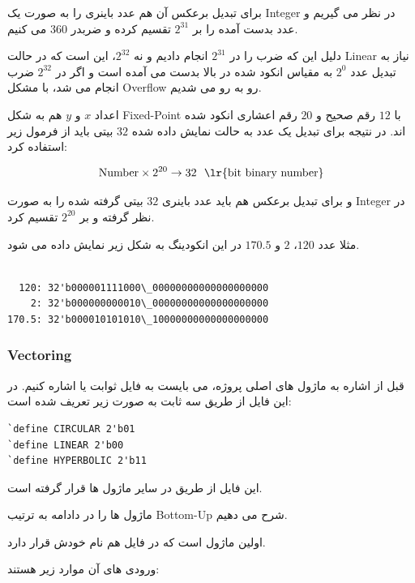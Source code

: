 \documentclass[12pt,titlepage,a4page , tikz , multi,table , svgnames,xcdraw]{article}
\begin{document}
برای تبدیل برعکس آن هم عدد باینری را به صورت یک Integer در نظر می گیریم و عدد بدست آمده را بر $2^{31}$ تقسیم کرده و ضربدر $360$ می کنیم.


دلیل این که ضرب را در $2^{31}$ انجام دادیم و نه $2^{32}$، این است که در حالت Linear نیاز به  تبدیل عدد $2^{0}$ به مقیاس انکود شده در بالا بدست می آمده است و اگر در $2^{32}$ ضرب انجام می شد، با مشکل Overflow رو به رو می شدیم.

اعداد $x$ و $y$ هم به شکل Fixed-Point با $12$ رقم صحیح و $20$ رقم اعشاری انکود شده اند. در نتیجه برای تبدیل یک عدد به حالت نمایش داده شده $32$ بیتی باید از فرمول زیر استفاده کرد:

$$\text{Number} \times 2^{20} \rightarrow 32 ~~\text{\lr{bit binary number}}$$

و برای تبدیل برعکس هم باید عدد باینری $32$ بیتی گرفته شده را به صورت Integer در نظر گرفته و بر $2^{20}$ تقسیم کرد.

مثلا عدد $120$، $2$ و $170.5$ در این انکودینگ به شکل زیر نمایش داده می شود.
 
 
 \begin{latin}
\begin{verbatim}

  120: 32'b000001111000\_00000000000000000000
    2: 32'b000000000010\_00000000000000000000
170.5: 32'b000010101010\_10000000000000000000
\end{verbatim}
\end{latin} 

 
\subsubsection{Vectoring}

قبل از اشاره به ماژول های اصلی پروژه، می بایست به فایل ثوابت یا  اشاره کنیم. در این فایل از طریق  سه ثابت به صورت زیر تعریف شده است:
\begin{latin}
\begin{verbatim}
`define CIRCULAR 2'b01
`define LINEAR 2'b00
`define HYPERBOLIC 2'b11
\end{verbatim}
\end{latin}

این فایل از طریق  در سایر ماژول ها قرار گرفته است.

ماژول ها را در دادامه به ترتیب Bottom-Up شرح می دهیم.

اولین ماژول  است که در فایل هم نام خودش قرار دارد. 

 ورودی های آن موارد زیر هستند:
\end{document}
